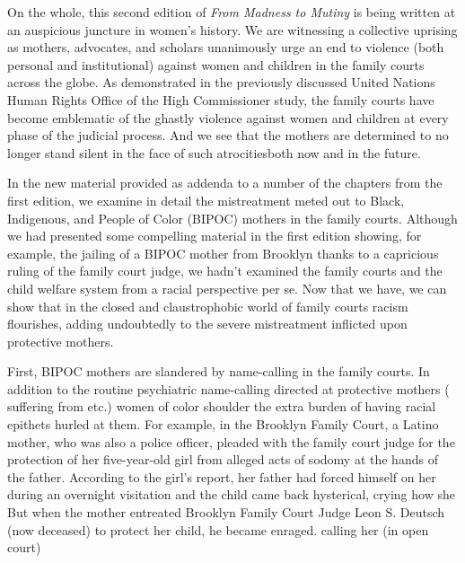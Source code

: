 On the whole, this second edition of \textit{From Madness to Mutiny} is being
written at an auspicious juncture in women’s history. We are witnessing
a collective uprising as mothers, advocates, and scholars unanimously
urge an end to violence (both personal and institutional) against women
and children in the family courts across the globe. As demonstrated in
the previously discussed United Nations Human Rights Office of the
High Commissioner study, the family courts have become emblematic
of the ghastly violence against women and children at every phase of
the judicial process. And we see that the mothers are determined to no
longer stand silent in the face of such atrocities\mdash{}both now and in the
future. \pfl{}




\noindent{}In the new material provided as addenda to a number of the chapters
from the first edition, we examine in detail the mistreatment meted
out to Black, Indigenous, and People of Color (BIPOC) mothers in the
family courts. Although we had presented some compelling material in
the first edition showing, for example, the jailing of a BIPOC mother
from Brooklyn thanks to a capricious ruling of the family court judge,
we hadn’t examined the family courts and the child welfare system
from a racial perspective per se. Now that we have, we can show that
in the closed and claustrophobic world of family courts racism 
flourishes, adding undoubtedly to the severe mistreatment inflicted upon
protective mothers. \pfl{}


\vspace{3em}


\noindent{}First, BIPOC mothers are slandered by name-calling in the family
courts. In addition to the routine psychiatric name-calling directed
at protective mothers ( suffering from    etc.) women of color shoulder the extra
burden of having racial epithets hurled at them. For example, in the
Brooklyn Family Court, a Latino mother, who was also a police officer, pleaded with the family court judge for the protection of her
five-year-old girl from alleged acts of sodomy at the hands of the father. 
According to the girl's report, her father had forced himself on her
during an overnight visitation and the child came back hysterical, crying how she   But when the mother entreated Brooklyn Family Court Judge
Leon S. Deutsch (now deceased) to protect her child, he became enraged. 
calling her (in open court)  \pfl{}

